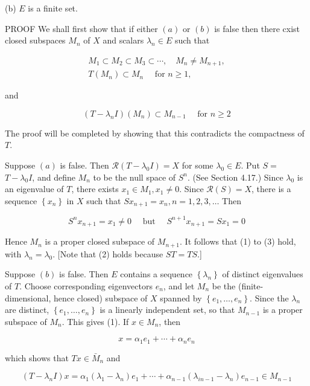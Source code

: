 \documentclass[10pt]{article}
\begin{document}
(b) $E$ is a finite set.

PROOF We shall first show that if either $(a)$ or $(b)$ is false then there cxist closed subspaces $M_{n}$ of $X$ and scalars $\lambda_{n} \in E$ such that

$$
\begin{gathered}
M_{1} \subset M_{2} \subset M_{3} \subset \cdots, \quad M_{n} \neq M_{n+1}, \\
T\left(M_{n}\right) \subset M_{n} \quad \text { for } n \geq 1,
\end{gathered}
$$

and

$$
\left(T-\lambda_{n} I\right)\left(M_{n}\right) \subset M_{n-1} \quad \text { for } n \geq 2
$$

The proof will be completed by showing that this contradicts the compactness of $T$.

Suppose $(a)$ is false. Then $\mathscr{R}\left(T-\lambda_{0} I\right)=X$ for some $\lambda_{0} \in E$. Put $S=$ $T-\lambda_{0} I$, and define $M_{n}$ to be the null space of $S^{n}$. (See Section 4.17.) Since $\lambda_{0}$ is an eigenvalue of $T$, there exists $x_{1} \in M_{1}, x_{1} \neq 0$. Since $\mathscr{R}(S)=X$, there is a sequence $\left\{x_{n}\right\}$ in $X$ such that $S x_{n+1}=x_{n}, n=1,2,3, \ldots$ Then

$$
S^{n} x_{n+1}=x_{1} \neq 0 \quad \text { but } \quad S^{n+1} x_{n+1}=S x_{1}=0
$$

Hence $M_{n}$ is a proper closed subspace of $M_{n+1}$. It follows that (1) to (3) hold, with $\lambda_{n}=\lambda_{0}$. [Note that (2) holds because $S T=T S$.]

Suppose $(b)$ is false. Then $E$ contains a sequence $\left\{\lambda_{n}\right\}$ of distinct eigenvalues of $T$. Choose corresponding eigenvectors $e_{n}$, and let $M_{n}$ be the (finite-dimensional, hence closed) subspace of $X$ spanned by $\left\{e_{1}, \ldots, e_{n}\right\}$. Since the $\lambda_{n}$ are distinct, $\left\{e_{1}, \ldots, e_{n}\right\}$ is a linearly independent set, so that $M_{n-1}$ is a proper subspace of $M_{n}$. This gives (1). If $x \in M_{n}$, then

$$
x=\alpha_{1} e_{1}+\cdots+\alpha_{n} e_{n}
$$

which shows that $T x \in \bar{M}_{n}$ and

$$
\left(T-\lambda_{n} I\right) x=\alpha_{1}\left(\lambda_{1}-\lambda_{n}\right) e_{1}+\cdots+\alpha_{n-1}\left(\lambda_{i n-1}-\lambda_{n}\right) e_{n-1} \in M_{n-1}
$$
\end{document}
